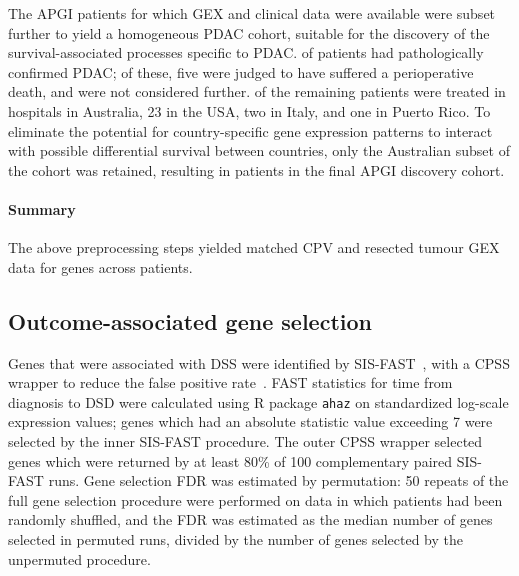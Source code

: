 \documentclass[dissertation.tex]{subfiles}
\begin{document}
The  \gls{APGI} patients for which \gls{GEX} and clinical data were available were subset further to yield a homogeneous \gls{PDAC} cohort, suitable for the discovery of the survival-associated processes specific to \gls{PDAC}.   of  patients had pathologically confirmed \gls{PDAC}; of these, five were judged to have suffered a perioperative death, and were not considered further.   of the  remaining patients were treated in hospitals in Australia, 23 in the USA, two in Italy, and one in Puerto Rico.  To eliminate the potential for country-specific gene expression patterns to interact with possible differential survival between countries, only the Australian subset of the cohort was retained, resulting in  patients in the final \gls{APGI} discovery cohort.

\paragraph{Summary}
The above preprocessing steps yielded matched \gls{CPV} and resected tumour \gls{GEX} data for  genes across  patients.

\subsection{Outcome-associated gene selection}
Genes that were associated with \gls{DSS} were identified by \gls{SIS}-\gls{FAST}~\cite{Gorst-Rasmussen2013}, with a \gls{CPSS} wrapper to reduce the false positive rate~\cite{Shah2013}.  \gls{FAST} statistics for time from diagnosis to \gls{DSD} were calculated using R package \texttt{ahaz} on standardized log-scale expression values; genes which had an absolute statistic value exceeding 7 were selected by the inner \gls{SIS}-\gls{FAST} procedure.  The outer \gls{CPSS} wrapper selected genes which were returned by at least 80\% of 100 complementary paired \gls{SIS}-\gls{FAST} runs.  Gene selection \gls{FDR} was estimated by permutation: 50 repeats of the full gene selection procedure were performed on data in which patients had been randomly shuffled, and the \gls{FDR} was estimated as the median number of genes selected in permuted runs, divided by the number of genes selected by the unpermuted procedure.
\end{document}
